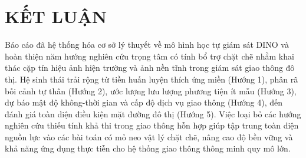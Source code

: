 \documentclass[11pt,a4paper]{article}
\begin{document}
\section{KẾT LUẬN}
Báo cáo đã hệ thống hóa cơ sở lý thuyết về mô hình học tự giám sát DINO và hoàn thiện năm hướng nghiên cứu trọng tâm có tính bổ trợ chặt chẽ nhằm khai thác cặp tín hiệu ảnh hiện trường và ảnh nền tĩnh trong giám sát giao thông đô thị. Hệ sinh thái trải rộng từ tiền huấn luyện thích ứng miền (Hướng 1), phân rã bối cảnh tự thân (Hướng 2), ước lượng lưu lượng phương tiện ít mẫu (Hướng 3), dự báo mật độ không-thời gian và cấp độ dịch vụ giao thông (Hướng 4), đến đánh giá toàn diện điều kiện mặt đường đô thị (Hướng 5). Việc loại bỏ các hướng nghiên cứu thiếu tính khả thi trong giao thông hỗn hợp giúp tập trung toàn diện nguồn lực vào các bài toán có mỏ neo vật lý chặt chẽ, nâng cao độ bền vững và khả năng ứng dụng thực tiễn cho hệ thống giao thông thông minh quy mô lớn.
\end{document}
